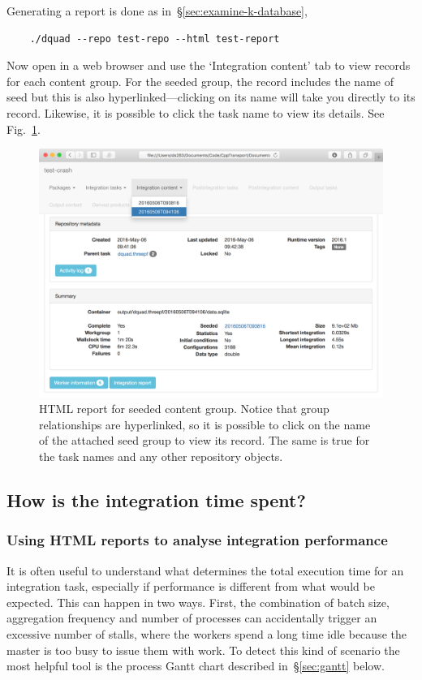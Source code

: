 \documentclass[11pt,a4paper]{article}
\renewcommand{\texttt}[1]{{\ttfamily\fontseries{l}\selectfont{#1}}}
\newcommand{\file}[1]{\texttt{{#1}}}
\begin{document}
Generating a report is done as in~\S\ref{sec:examine-k-database},
\begin{verbatim}
    ./dquad --repo test-repo --html test-report
\end{verbatim}
Now open \file{test-report/index.html} in a web browser
and
use the `Integration content' tab to view records for each
content group.
For the seeded group, the record includes the name of
seed but this is also hyperlinked---clicking on its name will take
you directly to its record.
Likewise, it is possible to click the task name to view
its details.
See Fig.~\ref{fig:seeded-group-report}.
\begin{figure}
    \begin{center}
        \includegraphics[scale=0.2]{Screenshots/seeded-task}    
    \end{center}
    \caption{\label{fig:seeded-group-report}HTML report for seeded
    content group.
    Notice that group relationships are hyperlinked, so it is possible
    to click on the name of the attached seed group to view its
    record.
    The same is true for the task names and any other repository objects.}
\end{figure}

\subsection{How is the integration time spent?}

\subsubsection{Using HTML reports to analyse integration performance}
It is often useful to understand what determines the total execution time
for an integration task,
especially if performance is different from
what would be expected.
This can happen in two ways.
First, the combination of batch size, aggregation frequency and
number of processes can accidentally trigger an excessive number of stalls,
where the workers spend a long time idle because the master is too busy
to issue them with work.
To detect this kind of scenario the most helpful tool is the process
Gantt chart described in~\S\ref{sec:gantt} below.
\end{document}
